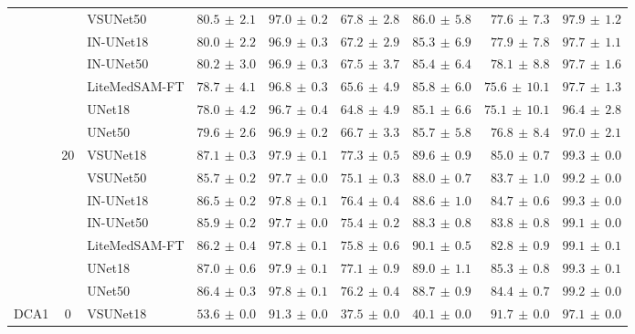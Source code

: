 \documentclass[twocolumn]{article}
\begin{document}
\begin{table}[t]
\begin{tabular}{l c l r r r r r r}
 &  & VSUNet50 & $\mathbf{80.5} \,\pm\, 2.1$ & $97.0 \,\pm\, 0.2$ & $67.8 \,\pm\, 2.8$ & $86.0 \,\pm\, 5.8$ & $77.6 \,\pm\, 7.3$ & $97.9 \,\pm\, 1.2$ \\
 &  & IN-UNet18 & $80.0 \,\pm\, 2.2$ & $96.9 \,\pm\, 0.3$ & $67.2 \,\pm\, 2.9$ & $85.3 \,\pm\, 6.9$ & $77.9 \,\pm\, 7.8$ & $97.7 \,\pm\, 1.1$ \\
 &  & IN-UNet50 & $80.2 \,\pm\, 3.0$ & $96.9 \,\pm\, 0.3$ & $67.5 \,\pm\, 3.7$ & $85.4 \,\pm\, 6.4$ & $78.1 \,\pm\, 8.8$ & $97.7 \,\pm\, 1.6$ \\
 &  & LiteMedSAM-FT & $78.7 \,\pm\, 4.1$ & $96.8 \,\pm\, 0.3$ & $65.6 \,\pm\, 4.9$ & $85.8 \,\pm\, 6.0$ & $75.6 \,\pm\, 10.1$ & $97.7 \,\pm\, 1.3$ \\
 &  & UNet18 & $78.0 \,\pm\, 4.2$ & $96.7 \,\pm\, 0.4$ & $64.8 \,\pm\, 4.9$ & $85.1 \,\pm\, 6.6$ & $75.1 \,\pm\, 10.1$ & $96.4 \,\pm\, 2.8$ \\
 &  & UNet50 & $79.6 \,\pm\, 2.6$ & $96.9 \,\pm\, 0.2$ & $66.7 \,\pm\, 3.3$ & $85.7 \,\pm\, 5.8$ & $76.8 \,\pm\, 8.4$ & $97.0 \,\pm\, 2.1$ \\
\cline{2-9}
 & \multirow{7}{*}{20} & VSUNet18 & $\mathbf{87.1} \,\pm\, 0.3$ & $97.9 \,\pm\, 0.1$ & $77.3 \,\pm\, 0.5$ & $89.6 \,\pm\, 0.9$ & $85.0 \,\pm\, 0.7$ & $99.3 \,\pm\, 0.0$ \\
 &  & VSUNet50 & $85.7 \,\pm\, 0.2$ & $97.7 \,\pm\, 0.0$ & $75.1 \,\pm\, 0.3$ & $88.0 \,\pm\, 0.7$ & $83.7 \,\pm\, 1.0$ & $99.2 \,\pm\, 0.0$ \\
 &  & IN-UNet18 & $86.5 \,\pm\, 0.2$ & $97.8 \,\pm\, 0.1$ & $76.4 \,\pm\, 0.4$ & $88.6 \,\pm\, 1.0$ & $84.7 \,\pm\, 0.6$ & $99.3 \,\pm\, 0.0$ \\
 &  & IN-UNet50 & $85.9 \,\pm\, 0.2$ & $97.7 \,\pm\, 0.0$ & $75.4 \,\pm\, 0.2$ & $88.3 \,\pm\, 0.8$ & $83.8 \,\pm\, 0.8$ & $99.1 \,\pm\, 0.0$ \\
 &  & LiteMedSAM-FT & $86.2 \,\pm\, 0.4$ & $97.8 \,\pm\, 0.1$ & $75.8 \,\pm\, 0.6$ & $90.1 \,\pm\, 0.5$ & $82.8 \,\pm\, 0.9$ & $99.1 \,\pm\, 0.1$ \\
 &  & UNet18 & $87.0 \,\pm\, 0.6$ & $97.9 \,\pm\, 0.1$ & $77.1 \,\pm\, 0.9$ & $89.0 \,\pm\, 1.1$ & $85.3 \,\pm\, 0.8$ & $99.3 \,\pm\, 0.1$ \\
 &  & UNet50 & $86.4 \,\pm\, 0.3$ & $97.8 \,\pm\, 0.1$ & $76.2 \,\pm\, 0.4$ & $88.7 \,\pm\, 0.9$ & $84.4 \,\pm\, 0.7$ & $99.2 \,\pm\, 0.0$ \\
\hline
\multirow{17}{*}{DCA1} & \multirow{5}{*}{0} & VSUNet18 & $\mathbf{53.6} \,\pm\, 0.0$ & $91.3 \,\pm\, 0.0$ & $37.5 \,\pm\, 0.0$ & $40.1 \,\pm\, 0.0$ & $91.7 \,\pm\, 0.0$ & $97.1 \,\pm\, 0.0$ \\

\end{tabular}
\end{table}
\end{document}
